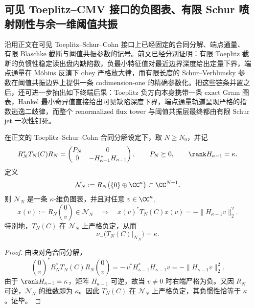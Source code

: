 \subsection{可见 Toeplitz--CMV 接口的负图表、有限 Schur 喷射刚性与余一维阈值共振}\label{subsec:conclusion-visible-toeplitz-cmv-negativechart-resonance}
沿用正文在可见 Toeplitz--Schur--Cohn 接口上已经固定的合同分解、端点通量、有限 Blaschke 截断与阈值共振参数的记号。前文已经分别证明：有限 Toeplitz 截断的负惯性稳定读出盘内缺陷数，负最小特征值对最近边界深度给出定量下界，端点通量在 Möbius 反演下 obey 严格放大律，而有限长度的 Schur--Verblunsky 参数在阈值共振边界上提供一条 codimension-one 的精确参数化。把这些链条并置之后，还可进一步抽出如下终端后果：Toeplitz 负方向本身携带一条 exact Gram 图表，Hankel 最小奇异值直接给出可见缺陷深度下界，端点通量轨道呈现严格的指数逃逸二歧律，而整个 renormalized flux tower 与阈值共振层最终都由有限 Schur jet 一次性钉死。

\begin{theorem}\label{thm:conclusion-visible-toeplitz-negative-gram-chart}
在正文的 Toeplitz--Schur--Cohn 合同分解设定下，取 \(N\ge N_0\)，并记
\[
R_N^{*}T_N(C)R_N=
\begin{pmatrix}
P_N & 0\\
0 & -H_{\kappa-1}^{*}H_{\kappa-1}
\end{pmatrix},
\qquad
P_N\succeq 0,
\qquad
\rank H_{\kappa-1}=\kappa.
\]
定义
\[
\mathcal N_N:=R_N\bigl(\{0\}\oplus\CC^\kappa\bigr)\subset \CC^{N+1}.
\]
则 \(\mathcal N_N\) 是一条 \(\kappa\)-维负图表，并且对任意 \(v\in\CC^\kappa\),
\[
x(v):=R_N\binom{0}{v}\in\mathcal N_N
\quad\Longrightarrow\quad
x(v)^*T_N(C)x(v)=-\|H_{\kappa-1}v\|_2^2.
\]
特别地，\(T_N(C)\) 在 \(\mathcal N_N\) 上严格负定，从而
\[
\nu_-\!\bigl(T_N(C)|_{\mathcal N_N}\bigr)=\kappa.
\]
\end{theorem}
\begin{proof}
由块对角合同分解，
\[
\binom{0}{v}^{*}R_N^{*}T_N(C)R_N\binom{0}{v}
=
-\,v^{*}H_{\kappa-1}^{*}H_{\kappa-1}v
=
-\|H_{\kappa-1}v\|_2^2.
\]
由于 \(\rank H_{\kappa-1}=\kappa\)，矩阵 \(H_{\kappa-1}\) 可逆，故当 \(v\neq 0\) 时右端严格为负。又因 \(R_N\) 可逆，\(\mathcal N_N\) 的维数即为 \(\kappa\)。因此 \(T_N(C)\) 在 \(\mathcal N_N\) 上严格负定，其负惯性恰等于 \(\kappa\)。证毕。
\end{proof}

